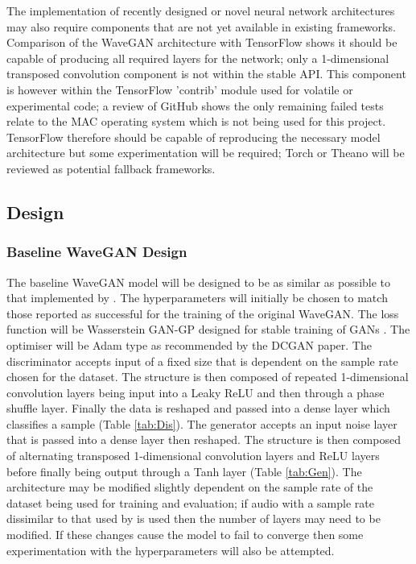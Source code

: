 \documentclass[a4paper, dvipsnames, titlepage]{article}
\begin{document}
The implementation of recently designed or novel neural network architectures may also require components that are not yet available in existing frameworks.
Comparison of the WaveGAN architecture with TensorFlow shows it should be capable of producing all required layers for the network; only a 1-dimensional transposed convolution component is not within the stable API.
\newline
\newline
This component is however within the TensorFlow 'contrib' module used for volatile or experimental code; a review of GitHub shows the only remaining failed tests relate to the MAC operating system which is not being used for this project.
TensorFlow therefore should be capable of reproducing the necessary model architecture but some experimentation will be required; Torch or Theano will be reviewed as potential fallback frameworks.

\subsection{Design}

\subsubsection{Baseline WaveGAN Design}

The baseline WaveGAN model will be designed to be as similar as possible to that implemented by \citeauthor{2018arXiv180204208D}.
The hyperparameters will initially be chosen to match those reported as successful for the training of the original WaveGAN.
The loss function will be Wasserstein GAN-GP designed for stable training of GANs \citep{2017arXiv170400028G}.
The optimiser will be Adam type as recommended by the DCGAN paper.
\newline
\newline
The discriminator accepts input of a fixed size that is dependent on the sample rate chosen for the dataset.
The structure is then composed of repeated 1-dimensional convolution layers being input into a Leaky ReLU and then through a phase shuffle layer.
Finally the data is reshaped and passed into a dense layer which classifies a sample (Table \ref{tab:Dis}).
\newline
\newline
The generator accepts an input noise layer that is passed into a dense layer then reshaped.
The structure is then composed of alternating transposed 1-dimensional convolution layers and ReLU layers before finally being output through a Tanh layer (Table \ref{tab:Gen}).
\newline
\newline
The architecture may be modified slightly dependent on the sample rate of the dataset being used for training and evaluation; if audio with a sample rate dissimilar to that used by \citeauthor{2018arXiv180204208D} is used then the number of layers may need to be modified.
If these changes cause the model to fail to converge then some experimentation with the hyperparameters will also be attempted.
\end{document}
